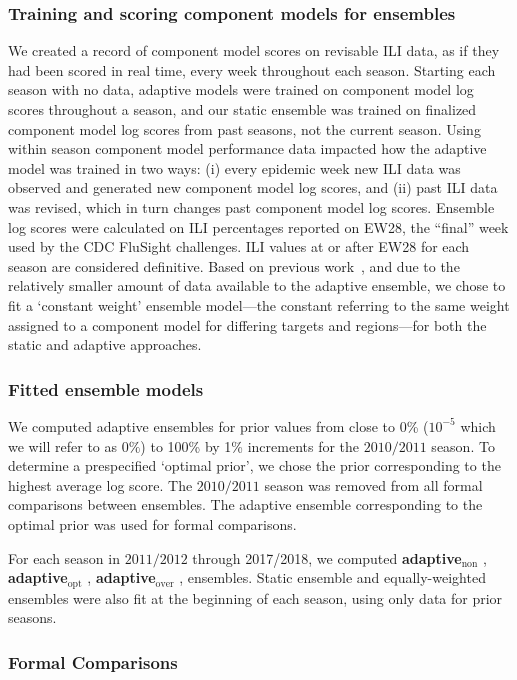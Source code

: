 \documentclass[sagev,times,Review,10pt]{sagej}
\def\adaptNon{\textbf{adaptive$_{\text{non}}$ }}
\def\adaptOpt{\textbf{adaptive$_{\text{opt}}$ }}
\def\adaptOver{\textbf{adaptive$_{\text{over}}$ }}
\begin{document}
\subsubsection{Training and scoring component models for ensembles}

We created a record of component model scores on revisable ILI data, as if they had been scored in real time, every week throughout each season.
Starting each season with no data, adaptive models were trained on component model log scores throughout a season, and our static ensemble was trained on finalized component model log scores from past seasons, not the current season.
Using within season component model performance data impacted how the adaptive model was trained in two ways: (i) every epidemic week new ILI data was observed and generated new component model log scores, and (ii) past ILI data was revised, which in turn changes past component model log scores.
Ensemble log scores were calculated on ILI percentages reported on EW28, the ``final'' week used by the CDC FluSight challenges.
ILI values at or after EW28 for each season are considered definitive.
Based on previous work~\citep{reich2019collaborativepnas}, and due to the relatively smaller amount of data available to the adaptive ensemble, we chose to fit a `constant weight' ensemble model---the constant referring to the same weight assigned to a component model for differing targets and regions---for both the static and adaptive approaches.

\subsubsection{Fitted ensemble models}

We computed adaptive ensembles for prior values from close to 0\% ($10^{-5}$ which we will refer to as $0\%$) to 100\% by 1\% increments for the $2010/2011$ season.
To determine a prespecified `optimal prior', we chose the prior corresponding to the highest average log score.
The $2010/2011$ season was removed from all formal comparisons between ensembles.
The adaptive ensemble corresponding to the optimal prior was used for formal comparisons.

For each season in $2011/2012$ through 2017/2018, we computed \adaptNon, \adaptOpt, \adaptOver,  ensembles.
Static ensemble and equally-weighted ensembles were also fit at the beginning of each season, using only data for prior seasons.


\subsubsection{Formal Comparisons}
\end{document}
